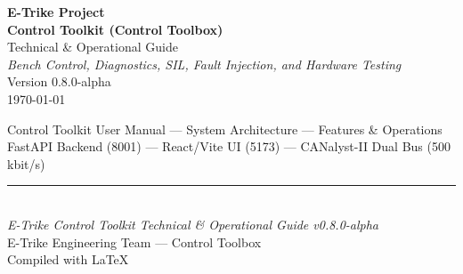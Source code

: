 \documentclass[12pt,a4paper,oneside]{report}
\begin{document}

\thispagestyle{empty}

\vspace*{40mm}

\begin{center}
  {\fontsize{28}{34}\selectfont\textbf{E-Trike Project}}\\[8mm]
  {\fontsize{22}{28}\selectfont\textbf{Control Toolkit (Control Toolbox)}}\\[4mm]
  {\fontsize{16}{20}\selectfont Technical \& Operational Guide}\\[20mm]
  {\fontsize{13}{16}\selectfont\textit{Bench Control, Diagnostics, SIL, Fault Injection, and Hardware Testing}}\\[30mm]
  {\fontsize{12}{15}\selectfont Version 0.8.0-alpha}\\[4mm]
  {\fontsize{11}{14}\selectfont \today}
\end{center}

\vfill

\begin{center}
  {\footnotesize
  Control Toolkit User Manual --- System Architecture --- Features \& Operations\\[2mm]
  FastAPI Backend (8001) --- React/Vite UI (5173) --- CANalyst-II Dual Bus (500 kbit/s)
  }
\end{center}

\newpage


\setcounter{tocdepth}{2}
\tableofcontents
\newpage




\vfill

\begin{center}
  \rule{0.5\textwidth}{0.4pt}\\[4mm]
  {\small\textit{E-Trike Control Toolkit Technical \& Operational Guide v0.8.0-alpha}}\\[2mm]
  {\small E-Trike Engineering Team --- Control Toolbox}\\[2mm]
  {\small Compiled with \LaTeX}
\end{center}
\end{document}
